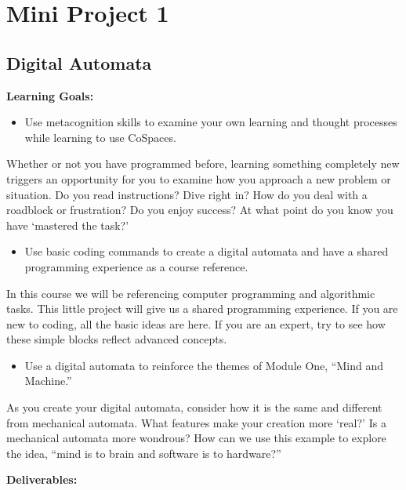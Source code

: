 \clearpage

\chapter{Mini Project 1}
\section{Digital Automata}

\textbf{Learning Goals:}

\begin{itemize}
    \item Use metacognition skills to examine your own learning and thought processes while learning to use CoSpaces.
\end{itemize}

Whether or not you have programmed before, learning something completely new triggers an opportunity for you to examine how you approach a new problem or situation. Do you read instructions? Dive right 
in? How do you deal with a roadblock or frustration? Do you enjoy success? At what point do you know you have ‘mastered the task?’

\begin{itemize}
    \item Use basic coding commands to create a digital automata and have a shared programming experience as a course reference.
\end{itemize}

In this course we will be referencing computer programming and algorithmic tasks. This little project will give us a shared programming experience. If you are new to coding, all the basic ideas are here. 
If you are an expert, try to see how these simple blocks reflect advanced concepts.

\begin{itemize}
    \item Use a digital automata to reinforce the themes of Module One, “Mind and Machine.”
\end{itemize}

As you create your digital automata, consider how it is the same and different from mechanical automata. What features make your creation more ‘real?’ Is a mechanical automata more wondrous? How can we use 
this example to explore the idea, “mind is to brain and software is to hardware?” \vspace*{1em}

\textbf{Deliverables:}

